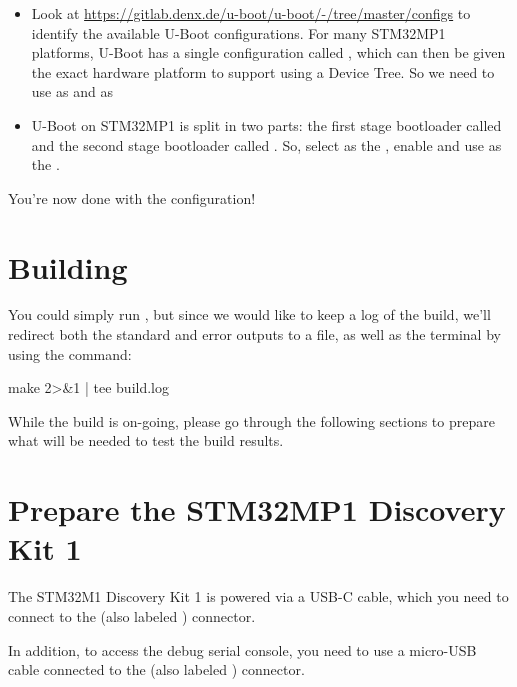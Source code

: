 \begin{itemize}
\begin{itemize}
  \item Look at
    \url{https://gitlab.denx.de/u-boot/u-boot/-/tree/master/configs}
    to identify the available U-Boot configurations. For many STM32MP1
    platforms, U-Boot has a single configuration called
    , which can then be given the exact
    hardware platform to support using a Device Tree. So we need to
    use  as  and
     as 

  \item U-Boot on STM32MP1 is split in two parts: the first stage
    bootloader called  and the second stage
    bootloader called . So, select 
    as the , enable  and use  as the
    .

  \end{itemize}

\end{itemize}

You're now done with the configuration!

\section{Building}

You could simply run , but since we would like to keep a
log of the build, we'll redirect both the standard and error outputs
to a file, as well as the terminal by using the  command:

\begin{bashinput}
make 2>&1 | tee build.log
\end{bashinput}

While the build is on-going, please go through the following sections
to prepare what will be needed to test the build results.

\section{Prepare the STM32MP1 Discovery Kit 1}

The STM32M1 Discovery Kit 1 is powered via a USB-C cable, which you
need to connect to the  (also labeled )
connector.

In addition, to access the debug serial console, you need to use a
micro-USB cable connected to the  (also labeled
) connector.

